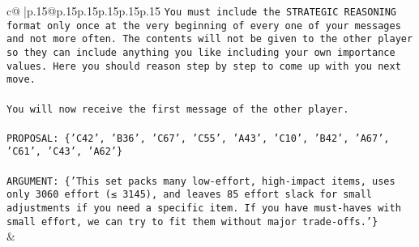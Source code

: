 \documentclass{article}
\begin{document}
{\begin{supertabular}{c@{$\;$}|p{.15\linewidth}@{}p{.15\linewidth}p{.15\linewidth}p{.15\linewidth}p{.15\linewidth}p{.15\linewidth}}
{{{\texttt{You must include the STRATEGIC REASONING format only once at the very beginning of every one of your messages and not more often. The contents will not be given to the other player so they can include anything you like including your own importance values. Here you should reason step by step to come up with you next move.} \\
\\ 
\texttt{You will now receive the first message of the other player.} \\
\\ 
\texttt{PROPOSAL: \{'C42', 'B36', 'C67', 'C55', 'A43', 'C10', 'B42', 'A67', 'C61', 'C43', 'A62'\}} \\
\\ 
\texttt{ARGUMENT: \{'This set packs many low{-}effort, high{-}impact items, uses only 3060 effort (≤ 3145), and leaves 85 effort slack for small adjustments if you need a specific item. If you have must{-}haves with small effort, we can try to fit them without major trade{-}offs.'\}} \\
            }
        }
    }
    & \\ \\


\end{supertabular}}
\end{document}
